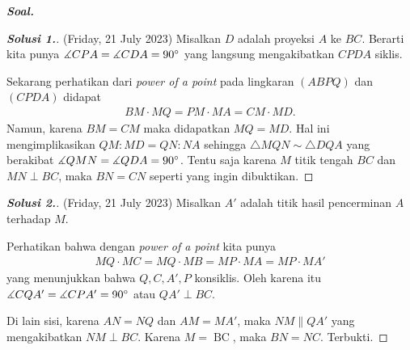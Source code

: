 \textbf{\textit{Soal. }}

\begin{proof}[\textbf{Solusi 1.}] (Friday, 21 July 2023) Misalkan $D$ adalah proyeksi $A$ ke $BC$. Berarti kita punya $\measuredangle CPA = \measuredangle CDA = 90^\circ$ yang langsung mengakibatkan $CPDA$ siklis. 

% 


Sekarang perhatikan dari \textit{power of a point} pada lingkaran $(ABPQ)$ dan $(CPDA)$ didapat
\begin{align*}
    BM \cdot MQ = PM \cdot MA = CM \cdot MD.
\end{align*}
Namun, karena $BM = CM$ maka didapatkan $MQ = MD$. Hal ini mengimplikasikan $QM : MD = QN : NA$ sehingga $\triangle MQN \sim \triangle DQA$ yang berakibat $\measuredangle QMN = \measuredangle QDA = 90^\circ$. Tentu saja karena $M$ titik tengah $BC$ dan $MN \perp BC$, maka $BN=CN$ seperti yang ingin dibuktikan.
\end{proof}

\begin{proof}[\textbf{Solusi 2.}] (Friday, 21 July 2023) Misalkan $A'$ adalah titik hasil pencerminan $A$ terhadap $M$. 
% 


Perhatikan bahwa dengan \textit{power of a point} kita punya
\begin{align*}
    MQ \cdot MC = MQ \cdot MB = MP \cdot MA = MP \cdot MA'
\end{align*}
yang menunjukkan bahwa $Q,C,A',P$ konsiklis. Oleh karena itu $\measuredangle CQA' = \measuredangle CPA' = 90^\circ$ atau $QA' \perp BC$.

Di lain sisi, karena $AN=NQ$ dan $AM=MA'$, maka $NM \parallel QA'$ yang mengakibatkan $NM \perp BC$. Karena $M = \operatorname{BC}$, maka $BN=NC$. Terbukti.
\end{proof}